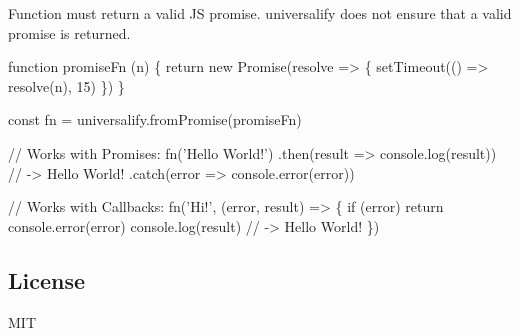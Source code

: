 Function must return a valid JS promise. {\ttfamily universalify} does not ensure that a valid promise is returned.


\begin{DoxyCode}
function promiseFn (n) \{
  return new Promise(resolve => \{
    setTimeout(() => resolve(n), 15)
  \})
\}

const fn = universalify.fromPromise(promiseFn)

// Works with Promises:
fn('Hello World!')
.then(result => console.log(result)) // -> Hello World!
.catch(error => console.error(error))

// Works with Callbacks:
fn('Hi!', (error, result) => \{
  if (error) return console.error(error)
  console.log(result)
  // -> Hello World!
\})
\end{DoxyCode}


\subsection*{License}

M\+IT 